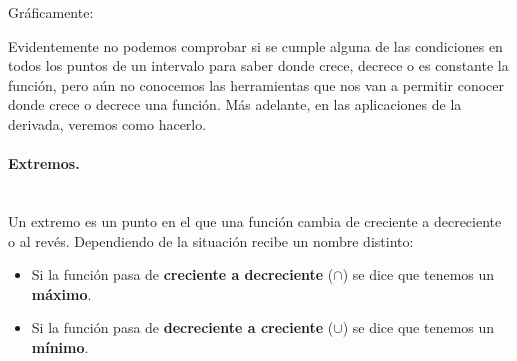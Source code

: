 \documentclass[a4paper,11pt,answers]{exam}
\begin{document}
Gráficamente:\\
\begin{center}
\hspace{1cm}
\hspace{1cm}
\end{center}

Evidentemente no podemos comprobar si se cumple alguna de las condiciones en todos los puntos de un intervalo para saber donde crece, decrece o es constante la función, pero aún no conocemos las herramientas que nos van a permitir conocer donde crece o decrece una función. Más adelante, en las aplicaciones de la derivada, veremos como hacerlo.
\paragraph{Extremos.}\mbox{}\\
Un extremo es un punto en el que una función cambia de creciente a decreciente o al revés. Dependiendo de la situación recibe un nombre distinto:
\begin{itemize}
	\item Si la función pasa de \textbf{creciente a decreciente} ($\cap$) se dice que tenemos un \textbf{máximo}.
	\item Si la función pasa de \textbf{decreciente a creciente} ($\cup$) se dice que tenemos un \textbf{mínimo}.
\end{itemize}
\end{document}
